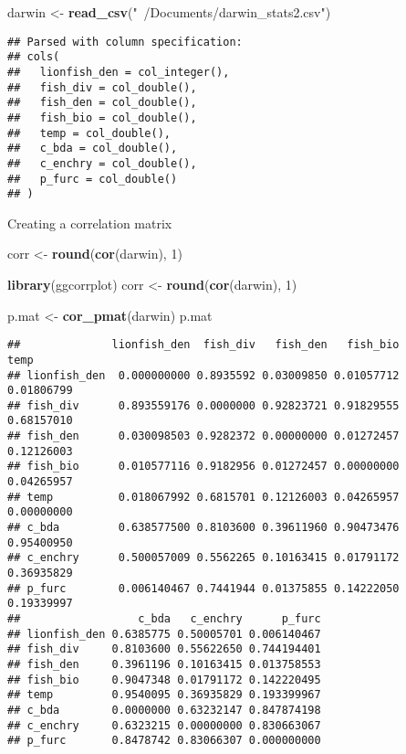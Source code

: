 \documentclass[]{article}
\newenvironment{Shaded}{\begin{snugshade}}{\end{snugshade}}
\newcommand{\KeywordTok}[1]{\textcolor[rgb]{0.13,0.29,0.53}{\textbf{#1}}}
\newcommand{\DecValTok}[1]{\textcolor[rgb]{0.00,0.00,0.81}{#1}}
\newcommand{\StringTok}[1]{\textcolor[rgb]{0.31,0.60,0.02}{#1}}
\newcommand{\NormalTok}[1]{#1}
\begin{document}
\begin{Shaded}
\begin{Highlighting}[]
\NormalTok{darwin <-}\StringTok{ }\KeywordTok{read_csv}\NormalTok{(}\StringTok{"~/Documents/darwin_stats2.csv"}\NormalTok{)}
\end{Highlighting}
\end{Shaded}

\begin{verbatim}
## Parsed with column specification:
## cols(
##   lionfish_den = col_integer(),
##   fish_div = col_double(),
##   fish_den = col_double(),
##   fish_bio = col_double(),
##   temp = col_double(),
##   c_bda = col_double(),
##   c_enchry = col_double(),
##   p_furc = col_double()
## )
\end{verbatim}

Creating a correlation matrix

\begin{Shaded}
\begin{Highlighting}[]
\NormalTok{corr <-}\StringTok{ }\KeywordTok{round}\NormalTok{(}\KeywordTok{cor}\NormalTok{(darwin), }\DecValTok{1}\NormalTok{)}
\end{Highlighting}
\end{Shaded}

\begin{Shaded}
\begin{Highlighting}[]
\KeywordTok{library}\NormalTok{(ggcorrplot)}
\NormalTok{corr <-}\StringTok{ }\KeywordTok{round}\NormalTok{(}\KeywordTok{cor}\NormalTok{(darwin), }\DecValTok{1}\NormalTok{)}
\end{Highlighting}
\end{Shaded}

\begin{Shaded}
\begin{Highlighting}[]
\NormalTok{p.mat <-}\StringTok{ }\KeywordTok{cor_pmat}\NormalTok{(darwin)}
\NormalTok{p.mat}
\end{Highlighting}
\end{Shaded}

\begin{verbatim}
##              lionfish_den  fish_div   fish_den   fish_bio       temp
## lionfish_den  0.000000000 0.8935592 0.03009850 0.01057712 0.01806799
## fish_div      0.893559176 0.0000000 0.92823721 0.91829555 0.68157010
## fish_den      0.030098503 0.9282372 0.00000000 0.01272457 0.12126003
## fish_bio      0.010577116 0.9182956 0.01272457 0.00000000 0.04265957
## temp          0.018067992 0.6815701 0.12126003 0.04265957 0.00000000
## c_bda         0.638577500 0.8103600 0.39611960 0.90473476 0.95400950
## c_enchry      0.500057009 0.5562265 0.10163415 0.01791172 0.36935829
## p_furc        0.006140467 0.7441944 0.01375855 0.14222050 0.19339997
##                  c_bda   c_enchry      p_furc
## lionfish_den 0.6385775 0.50005701 0.006140467
## fish_div     0.8103600 0.55622650 0.744194401
## fish_den     0.3961196 0.10163415 0.013758553
## fish_bio     0.9047348 0.01791172 0.142220495
## temp         0.9540095 0.36935829 0.193399967
## c_bda        0.0000000 0.63232147 0.847874198
## c_enchry     0.6323215 0.00000000 0.830663067
## p_furc       0.8478742 0.83066307 0.000000000
\end{verbatim}
\end{document}

